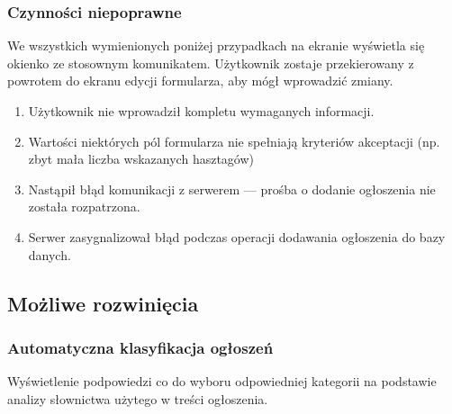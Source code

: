\documentclass[licencjacka]{pracamgr}
\begin{document}
    \subsubsection{Czynności niepoprawne}
    We wszystkich wymienionych poniżej przypadkach na ekranie wyświetla się okienko ze stosownym komunikatem. Użytkownik zostaje przekierowany z powrotem do ekranu edycji formularza, aby mógł wprowadzić zmiany.
    \begin{enumerate}
        \item Użytkownik nie wprowadził kompletu wymaganych informacji.
        \item Wartości niektórych pól formularza nie spełniają kryteriów akceptacji (np. zbyt mała liczba wskazanych hasztagów)
        \item Nastąpił błąd komunikacji z serwerem --- prośba o dodanie ogłoszenia nie została rozpatrzona.
        \item Serwer zasygnalizował błąd podczas operacji dodawania ogłoszenia do bazy danych.
    \end{enumerate}
    \subsection{Możliwe rozwinięcia}
    \subsubsection{Automatyczna klasyfikacja ogłoszeń}
    Wyświetlenie podpowiedzi co do wyboru odpowiedniej kategorii na podstawie analizy słownictwa użytego w treści ogłoszenia.
\end{document}
